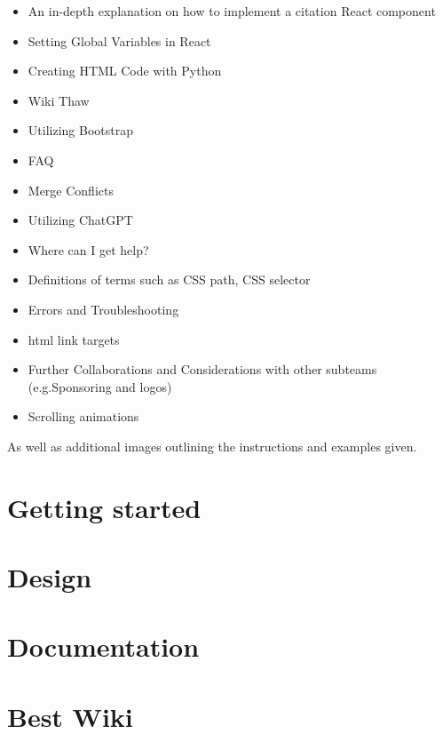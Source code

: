 \documentclass[a4paper, 11pt, twoside]{book}
\begin{document}
\begin{itemize}
    \item An in-depth explanation on how to implement a citation React component
    \item Setting Global Variables in React
    \item Creating HTML Code with Python
    \item Wiki Thaw
    \item Utilizing Bootstrap
    \item FAQ
    \item Merge Conflicts
    \item Utilizing ChatGPT
    \item Where can I get help?
    \item Definitions of terms such as CSS path, CSS selector
    \item Errors and Troubleshooting
    \item html link targets
    \item Further Collaborations and Considerations with other subteams (e.g.Sponsoring and logos)
    \item Scrolling animations
\end{itemize}
As well as additional images outlining the instructions and examples given.
\newpage

\mainmatter
\pagecolor{pgcolor}
\chapter{Getting started} \label{ch:started}

\newpage
\chapter{Design} \label{ch:design}

\newpage
\chapter{Documentation} \label{ch:docu}

\newpage
%
\chapter{Best Wiki} \label{ch:bestwiki}
%
\newpage
\end{document}
